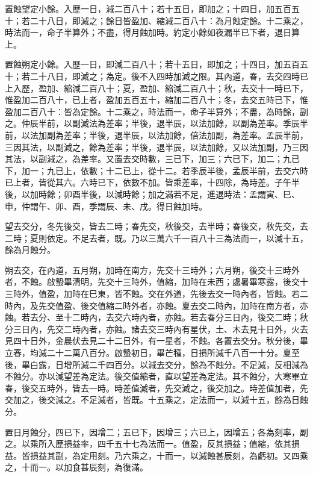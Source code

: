 \begin{pinyinscope}
 置蝕望定小餘。入歷一日，減二百八十；若十五日，即加之；十四日，加五百五十；若二十八日，即減之；餘日皆盈加、縮減二百八十：為月蝕定餘。十二乘之，時法而一，命子半算外；不盡，得月蝕加時。約定小餘如夜漏半已下者，退日算上。



 置蝕朔定小餘。入歷一日，即減二百八十；若十五日，即加之；十四日，加五百五十；若二十八日，即減之；為定。後不入四時加減之限。其內道，春，去交四時已上入歷，盈加、縮減二百八十；夏，盈加、縮減二百八十；秋，去交十一時已下，惟盈加二百八十，已上者，盈加五百五十，縮加二百八十；冬，去交五時已下，惟盈加二百八十：皆為定餘。十二乘之，時法而一，命子半算外；不盡，為時餘，副之。仲辰半前，以副減法為差率；半後，退半辰，以法加餘，以副為差率。季辰半前，以法加副為差率；半後，退半辰，以法加餘，倍法加副，為差率。孟辰半前，三因其法，以副減之，餘為差率；半後，退半辰，以法加餘，又以法加副，乃三因其法，以副減之，為差率。又置去交時數，三已下，加三；六已下，加二；九已下，加一；九已上，依數；十二已上，從十二。若季辰半後，孟辰半前，去交六時已上者，皆從其六。六時已下，依數不加。皆乘差率，十四除，為時差。子午半後，以加時餘；卯酉半後，以減時餘；加之滿若不足，進退時法：孟謂寅、巳、申，仲謂午、卯、酉，季謂辰、未、戌。得日蝕加時。



 望去交分，冬先後交，皆去二時；春先交，秋後交，去半時；春後交，秋先交，去二時；夏則依定。不足去者，既。乃以三萬六千一百八十三為法而一，以減十五，餘為月蝕分。



 朔去交，在內道，五月朔，加時在南方，先交十三時外；六月朔，後交十三時外者，不蝕。啟蟄畢清明，先交十三時外，值縮，加時在未西；處暑畢寒露，後交十三時外，值盈，加時在巳東，皆不蝕。交在外道，先後去交一時內者，皆蝕。若二時內，及先交值盈、後交值縮二時外者，亦蝕。夏去交二時內，加時在南方者，亦蝕。若去分、至十二時內，去交六時內者，亦蝕。若去春分三日內，後交二時；秋分三日內，先交二時內者，亦蝕。諸去交三時內有星伏，土、木去見十日外，火去見四十日外，金晨伏去見二十二日外，有一星者，不蝕。各置去交分。秋分後，畢立春，均減二十二萬八百分。啟蟄初日，畢芒種，日損所減千八百一十分。夏至後，畢白露，日增所減二千四百分。以減去交分，餘為不蝕分。不足減，反相減為不蝕分。亦以減望差為定法。後交值縮者，直以望差為定法。其不蝕分，大寒畢立春，後交五時外，皆去一時。時差值減者，先交減之，後交加之。時差值加者，先交加之，後交減之。不足減者，皆既。十五乘之，定法而一，以減十五，餘為日蝕分。



 置日月蝕分，四已下，因增二；五已下，因增三；六已上，因增五；各為刻率，副之。以乘所入歷損益率，四千五十七為法而一。值盈，反其損益；值縮，依其損益。皆損益其副，為定用刻。乃六乘之，十而一，以減蝕甚辰刻，為虧初。又四乘之，十而一。以加食甚辰刻，為復滿。



\end{pinyinscope}